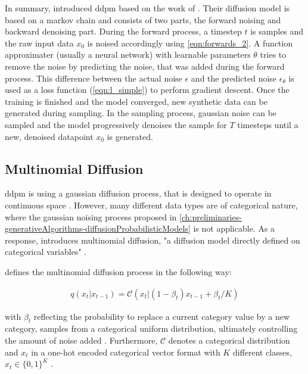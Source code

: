 In summary, \cite{ho2020DenoisingDiffusionProbabilistic} introduced \gls{ddpm} based on the work of \cite{sohl-dickstein2015DeepUnsupervisedLearning}.
Their diffusion model is based on a markov chain and consists of two parts, the forward noising and backward denoising part.
During the forward process, a timestep $t$ is samples and the raw input data $x_0$ is noised accordingly using \autoref{eqn:forwards_2}.
A function approximater (usually a neural network) with learnable parameters $\theta$ tries to remove the noise by predicting the noise, that was added during the forward process.
This difference between the actual noise $\epsilon$ and the predicted noise $\epsilon_{\theta}$ is used as a loss function (\autoref{eqn:l_simple}) to perform gradient descent.
Once the training is finished and the model converged, new synthetic data can be generated during sampling.
In the sampling process, gaussian noise can be sampled and the model progressively denoises the sample for $T$ timesteps until a new, denoised datapoint $x_0$ is generated.

\subsection{Multinomial Diffusion}
\label{ch:multinomial}
\gls{ddpm} is using a gaussian diffusion process, that is designed to operate in continuous space \cite{kotelnikov2022TabDDPMModellingTabular}.
However, many different data types are of categorical nature, where the gaussian noising process proposed in \autoref{ch:preliminaries-generativeAlgorithms-diffusionProbabilisticModels} is not applicable.
As a response, \cite{hoogeboom2021ArgmaxFlowsMultinomial} introduces multinomial diffusion, "a diffusion model directly defined on categorical variables" \cite[p, 3]{hoogeboom2021ArgmaxFlowsMultinomial}.

\cite{hoogeboom2021ArgmaxFlowsMultinomial} defines the multinomial diffusion process in the following way:

\begin{equation}
  \begin{align*}
    \label{eqn:mul_diff1}
    q(x_{t}|x_{t-1}) = \mathcal{C}(x_t|(1-\beta_t)x_{t-1}+\beta_t/K)
  \end{align*}
\end{equation}

with $\beta_t$ reflecting the probability to replace a current category value by a new category, samples from a categorical uniform distribution, ultimately controlling the amount of noise added \cite{hoogeboom2021ArgmaxFlowsMultinomial}.
Furthermore, $\mathcal{C}$ denotes a categorical distribution and $x_t$ in a one-hot encoded categorical vector format with $K$ different classes, $x_t\in\{0,1\}^K$ \cite{hoogeboom2021ArgmaxFlowsMultinomial}.

